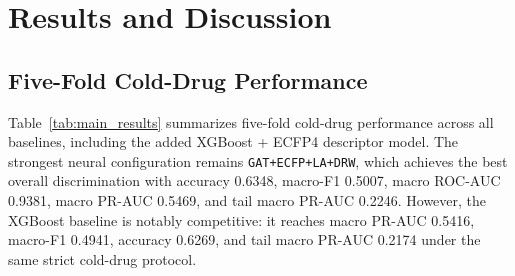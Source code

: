 \chapter{Results and Discussion}

\section{Five-Fold Cold-Drug Performance}
Table~\ref{tab:main_results} summarizes five-fold cold-drug performance across all baselines, including the added XGBoost + ECFP4 descriptor model. The strongest neural configuration remains \texttt{GAT+ECFP+LA+DRW}, which achieves the best overall discrimination with accuracy 0.6348, macro-F1 0.5007, macro ROC-AUC 0.9381, macro PR-AUC 0.5469, and tail macro PR-AUC 0.2246. However, the XGBoost baseline is notably competitive: it reaches macro PR-AUC 0.5416, macro-F1 0.4941, accuracy 0.6269, and tail macro PR-AUC 0.2174 under the same strict cold-drug protocol.

